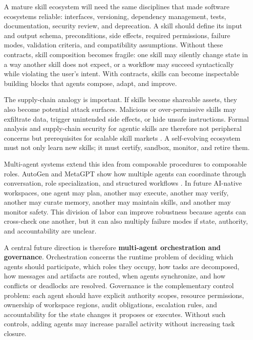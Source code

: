A mature skill ecosystem will need the same disciplines that made software ecosystems reliable: interfaces, versioning, dependency management, tests, documentation, security review, and deprecation. A skill should define its input and output schema, preconditions, side effects, required permissions, failure modes, validation criteria, and compatibility assumptions. Without these contracts, skill composition becomes fragile: one skill may silently change state in a way another skill does not expect, or a workflow may succeed syntactically while violating the user's intent. With contracts, skills can become inspectable building blocks that agents compose, adapt, and improve.

The supply-chain analogy is important. If skills become shareable assets, they also become potential attack surfaces. Malicious or over-permissive skills may exfiltrate data, trigger unintended side effects, or hide unsafe instructions. Formal analysis and supply-chain security for agentic skills are therefore not peripheral concerns but prerequisites for scalable skill markets \citep{bhardwaj2026skillfortify}. A self-evolving ecosystem must not only learn new skills; it must certify, sandbox, monitor, and retire them.

Multi-agent systems extend this idea from composable procedures to composable roles. AutoGen and MetaGPT show how multiple agents can coordinate through conversation, role specialization, and structured workflows \citep{wu2023autogen,hong2023metagpt}. In future AI-native workspaces, one agent may plan, another may execute, another may verify, another may curate memory, another may maintain skills, and another may monitor safety. This division of labor can improve robustness because agents can cross-check one another, but it can also multiply failure modes if state, authority, and accountability are unclear.

A central future direction is therefore \textbf{multi-agent orchestration and governance}. Orchestration concerns the runtime problem of deciding which agents should participate, which roles they occupy, how tasks are decomposed, how messages and artifacts are routed, when agents synchronize, and how conflicts or deadlocks are resolved. Governance is the complementary control problem: each agent should have explicit authority scopes, resource permissions, ownership of workspace regions, audit obligations, escalation rules, and accountability for the state changes it proposes or executes. Without such controls, adding agents may increase parallel activity without increasing task closure.

